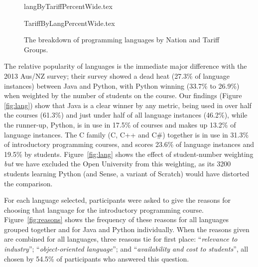 \documentclass[a4paper,11pt]{article}
\begin{document}

\begin{figure}[ht]
\begin{center}
{langByTariffPercentWide.tex}
\end{center}%
%
\begin{center}
{TariffByLangPercentWide.tex}
\end{center}
\caption{The breakdown of programming languages by Nation and Tariff Groups.\label{fig;LangTariff}}
\end{figure}

The relative popularity of languages is the immediate major difference
with the 2013 Aus/NZ survey; their survey showed a dead heat (27.3\%
of language instances) between Java and Python, with Python winning
(33.7\% to 26.9\%) when weighted by the number of students on the
course.  Our findings (Figure \ref{fig:lang}) show that Java is a
clear winner by any metric, being used in over half the courses
(61.3\%) and just under half of all language instances (46.2\%), while
the runner-up, Python, is in use in 17.5\% of courses and makes up
13.2\% of language instances. The C family (C, C++ and C\#) together
is in use in 31.3\% of introductory programming courses, and scores
23.6\% of language instances and 19.5\% by
students. Figure~\ref{fig:lang} shows the effect of student-number
weighting \emph{but} we have excluded the Open University from this
weighting, as its 3200 students learning Python (and Sense, a variant
of Scratch) would have distorted the comparison.

For each language selected, participants were asked to give the
reasons for choosing that language for the introductory programming
course. Figure~\ref{fig:reasons} shows the frequency of these reasons
for all languages grouped together and for Java and Python
individually. When the reasons given are combined for all languages,
three reasons tie for first place: ``{\emph{relevance to industry}}'';
``{\emph{object-oriented language}}''; and ``{\emph{availability and
cost to students}}'', all chosen by 54.5\% of participants who
answered this question.
\end{document}
